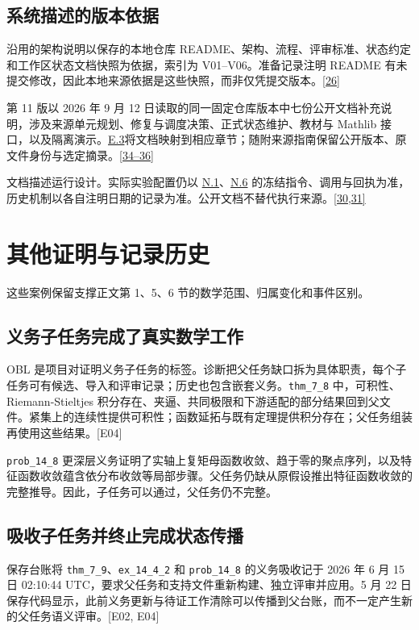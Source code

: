 \subsection[系统描述的版本依据]{\texorpdfstring{\protect\hypertarget{a5}{}系统描述的版本依据}{系统描述的版本依据}}
沿用的架构说明以保存的本地仓库 README、架构、流程、评审标准、状态约定和工作区状态文档快照为依据，索引为 V01–V06。准备记录注明 README 有未提交修改，因此本地来源依据是这些快照，而非仅凭提交版本。\href{zh.pdf\#ref-26}{\mbox{[26]}}

第 11 版以 2026 年 9 月 12 日读取的同一固定仓库版本中七份公开文档补充说明，涉及来源单元规划、修复与调度决策、正式状态维护、教材与 Mathlib 接口，以及隔离演示。\hyperlink{e3}{E.3}将文档映射到相应章节；随附来源指南保留公开版本、原文件身份与选定摘录。\href{zh.pdf\#ref-34}{\mbox{[34–36]}}

文档描述运行设计。实际实验配置仍以 \hyperlink{n1}{N.1}、\hyperlink{n6}{N.6} 的冻结指令、调用与回执为准，历史机制以各自注明日期的记录为准。公开文档不替代执行来源。\href{zh.pdf\#ref-30}{\mbox{[30,31]}}

\section[其他证明与记录历史]{\texorpdfstring{\protect\hypertarget{appendix-b}{}其他证明与记录历史}{其他证明与记录历史}}
这些案例保留支撑正文第 1、5、6 节的数学范围、归属变化和事件区别。

\subsection[义务子任务完成了真实数学工作]{\texorpdfstring{\protect\hypertarget{b1}{}义务子任务完成了真实数学工作}{义务子任务完成了真实数学工作}}
OBL 是项目对证明义务子任务的标签。诊断把父任务缺口拆为具体职责，每个子任务可有候选、导入和评审记录；历史也包含嵌套义务。\nolinkurl{thm_7_8} 中，可积性、Riemann-Stieltjes 积分存在、夹逼、共同极限和下游适配的部分结果回到父文件。紧集上的连续性提供可积性；函数延拓与既有定理提供积分存在；父任务组装再使用这些结果。[E04]

\nolinkurl{prob_14_8} 更深层义务证明了实轴上复矩母函数收敛、趋于零的聚点序列，以及特征函数收敛蕴含依分布收敛等局部步骤。父任务仍缺从原假设推出特征函数收敛的完整推导。因此，子任务可以通过，父任务仍不完整。

\subsection[吸收子任务并终止完成状态传播]{\texorpdfstring{\protect\hypertarget{b2}{}吸收子任务并终止完成状态传播}{吸收子任务并终止完成状态传播}}
保存台账将 \nolinkurl{thm_7_9}、\nolinkurl{ex_14_4_2} 和 \nolinkurl{prob_14_8} 的义务吸收记于 2026 年 6 月 15 日 02:10:44 UTC，要求父任务和支持文件重新构建、独立评审并应用。5 月 22 日保存代码显示，此前义务更新与待证工作清除可以传播到父台账，而不一定产生新的父任务语义评审。[E02, E04]

